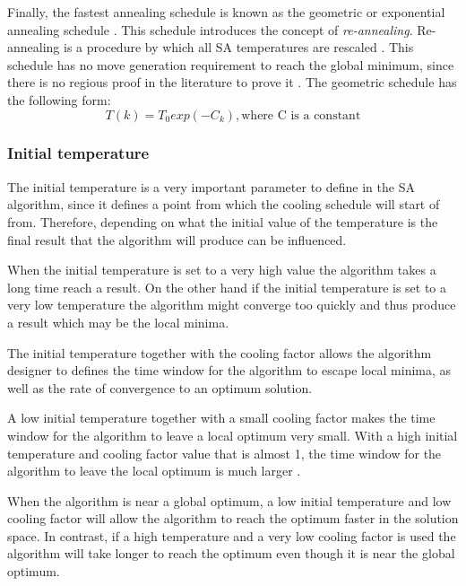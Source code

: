 Finally, the fastest annealing schedule is known as the geometric or exponential annealing schedule \cite{SASingleMultiObj}. This schedule introduces the concept of \emph{re-annealing}. Re-annealing is a procedure by which all SA temperatures are rescaled \cite{VeryFastSAImageEnchancement}. This schedule has no move generation requirement to reach the global minimum, since there is no regious proof in the literature to prove it \cite{SASingleMultiObj}. The geometric schedule has the following form:
\begin{equation}
\label{eq:geocooling}
	T(k)=T_0exp(-C_k),\text{where C is a constant}
\end{equation}
\subsubsection{Initial temperature}
The initial temperature is a very important parameter to define in the SA algorithm, since it defines a point from which the cooling schedule will start of from. Therefore, depending on what the initial value of the temperature is the final result that the algorithm will produce can be influenced\cite{SALongestCommon,VariousCoolingSA,AutoConfigSA}.

When the initial temperature is set to a very high value the algorithm takes a long time reach a result. On the other hand if the initial temperature is set to a very low temperature the algorithm might converge too quickly and thus produce a result which may be the local minima\cite{SALongestCommon,VariousCoolingSA,AutoConfigSA}.

The initial temperature together with the cooling factor allows the algorithm designer to defines the time window for the algorithm to escape local minima, as well as the rate of convergence to an optimum solution\cite{SALongestCommon,VariousCoolingSA}.

A low initial temperature together with a small cooling factor makes the time window for the algorithm to leave a local optimum very small\cite{SALongestCommon}. With a high initial temperature and cooling factor value that is almost 1, the time window for the algorithm to leave the local optimum is much larger \cite{SALongestCommon}. 

When the algorithm is near a global optimum, a low initial temperature and low cooling factor will allow the algorithm to reach the optimum faster in the solution space. In contrast, if a high temperature and a very low cooling factor is used the algorithm will take longer to reach the optimum even though it is near the global optimum\cite{SALongestCommon}.

